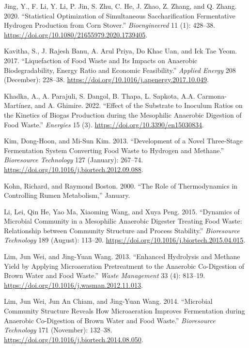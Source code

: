\documentclass[11pt]{report}
\begin{document}
\begin{hangparas}{1.5em}{1}
\hypertarget{citeproc_bib_item_32}{Jing, Y., F. Li, Y. Li, P. Jin, S. Zhu, C. He, J. Zhao, Z. Zhang, and Q. Zhang. 2020. “Statistical Optimization of Simultaneous Saccharification Fermentative Hydrogen Production from Corn Stover.” \textit{Bioengineered} 11 (1): 428–38. \url{https://doi.org/10.1080/21655979.2020.1739405}.}

\hypertarget{citeproc_bib_item_33}{Kavitha, S., J. Rajesh Banu, A. Arul Priya, Do Khac Uan, and Ick Tae Yeom. 2017. “Liquefaction of Food Waste and Its Impacts on Anaerobic Biodegradability, Energy Ratio and Economic Feasibility.” \textit{Applied Energy} 208 (December): 228–38. \url{https://doi.org/10.1016/j.apenergy.2017.10.049}.}

\hypertarget{citeproc_bib_item_34}{Khadka, A., A. Parajuli, S. Dangol, B. Thapa, L. Sapkota, A.A. Carmona-Martínez, and A. Ghimire. 2022. “Effect of the Substrate to Inoculum Ratios on the Kinetics of Biogas Production during the Mesophilic Anaerobic Digestion of Food Waste.” \textit{Energies} 15 (3). \url{https://doi.org/10.3390/en15030834}.}

\hypertarget{citeproc_bib_item_35}{Kim, Dong-Hoon, and Mi-Sun Kim. 2013. “Development of a Novel Three-Stage Fermentation System Converting Food Waste to Hydrogen and Methane.” \textit{Bioresource Technology} 127 (January): 267–74. \url{https://doi.org/10.1016/j.biortech.2012.09.088}.}

\hypertarget{citeproc_bib_item_36}{Kohn, Richard, and Raymond Boston. 2000. “The Role of Thermodynamics in Controlling Rumen Metabolism,” January.}

\hypertarget{citeproc_bib_item_37}{Li, Lei, Qin He, Yao Ma, Xiaoming Wang, and Xuya Peng. 2015. “Dynamics of Microbial Community in a Mesophilic Anaerobic Digester Treating Food Waste: Relationship between Community Structure and Process Stability.” \textit{Bioresource Technology} 189 (August): 113–20. \url{https://doi.org/10.1016/j.biortech.2015.04.015}.}

\hypertarget{citeproc_bib_item_38}{Lim, Jun Wei, and Jing-Yuan Wang. 2013. “Enhanced Hydrolysis and Methane Yield by Applying Microaeration Pretreatment to the Anaerobic Co-Digestion of Brown Water and Food Waste.” \textit{Waste Management} 33 (4): 813–19. \url{https://doi.org/10.1016/j.wasman.2012.11.013}.}

\hypertarget{citeproc_bib_item_39}{Lim, Jun Wei, Jun An Chiam, and Jing-Yuan Wang. 2014. “Microbial Community Structure Reveals How Microaeration Improves Fermentation during Anaerobic Co-Digestion of Brown Water and Food Waste.” \textit{Bioresource Technology} 171 (November): 132–38. \url{https://doi.org/10.1016/j.biortech.2014.08.050}.}


\end{hangparas}
\end{document}
